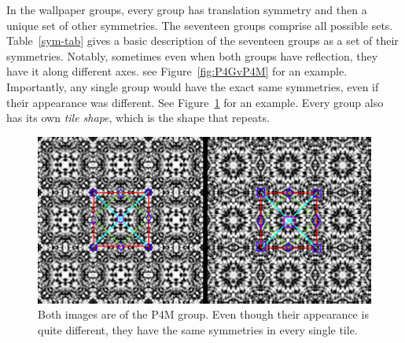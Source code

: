 In the wallpaper groups, every group has translation symmetry and then a unique set of other symmetries. The seventeen groups comprise all possible sets. Table~\ref{sym-tab} gives a basic description of the seventeen groups as a set of their symmetries. Notably, sometimes even when both groups have reflection, they have it along different axes. see Figure~\ref{fig:P4GvP4M} for an example. Importantly, any single group would have the exact same symmetries, even if their appearance was different. See Figure~\ref{P4MvP4M} for an example. Every group also has its own \textit{tile shape}, which is the shape that repeats.

\begin{figure}[!ht]
\centering
\includegraphics[width=0.9\columnwidth]{ann_images_same}
\caption{Both images are of the P4M group. Even though their appearance is quite different, they have the same symmetries in every single tile. }
\label{P4MvP4M}
\end{figure}

